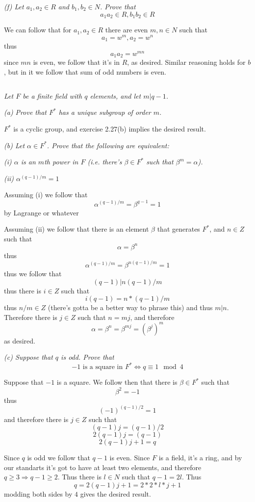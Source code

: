 \documentclass[11pt,oneside,titlepage]{book}
\DeclareMathOperator \lra {\Leftrightarrow}
\DeclareMathOperator \ra {\Rightarrow}
\begin{document}
\textit{(f) Let $a_1, a_2 \in R$ and $b_1, b_2 \in N$. Prove that
  $$a_1 a_2 \in R, b_1 b_2 \in R$$
}

We can follow that for $a_1, a_2 \in R$ there are even $m, n \in N$
such that
$$a_1 = w^m, a_2 = w^n$$
thus
$$a_1 a_2 = w^{mn}$$
since $mn$ is even, we follow that it's in $R$, as desired. Similar reasoning holds
for $b$, but in it we follow that sum of odd numbers is even.

\subsection{}

\textit{Let $F$ be a finite field with $q$ elements, and let $m | q - 1$.}

\textit{(a) Prove that $F^*$ has a unique subgroup of order $m$.}

$F^*$ is a cyclic group, and exercise 2.27(b) implies the desired result.

\textit{(b) Let $\alpha \in F^*$. Prove that the following are equivalent:}

\textit{(i) $\alpha$ is an $m$th power in $F$ (i.e. there's $\beta \in F^*$
  such that $\beta^m = \alpha$).}

\textit{(ii) $\alpha^{(q - 1)/m} = 1$}

Assuming (i) we follow that
$$\alpha^{(q - 1)/m} = \beta^{q - 1} = 1$$
by Lagrange or whatever

Assuming (ii) we follow that there is an element $\beta$ that
generates $F^*$, and $n \in Z$ such that
$$\alpha = \beta^n$$
thus
$$\alpha^{(q - 1)/m} =  \beta^{n(q - 1)/m} = 1$$
thus we follow that
$$(q - 1) | n(q - 1)/m$$
thus there is $i \in Z$ such that
$$i(q - 1) = n * (q - 1) / m$$
thus $n / m \in Z$ (there's gotta be a better way to phrase this) and
thus $m | n$. Therefore there is $j \in Z$ such that $n = mj$, and
therefore
$$\alpha = \beta^n = \beta^{mj} = (\beta^{j})^m$$
as desired.

\textit{(c) Suppose that $q$ is odd. Prove that
  $$-1 \text{ is a square in } F^* \lra q \equiv 1 \mod 4$$}

Suppose that $-1$ is a square. We follow then that there is
$\beta \in F^*$ such that
$$\beta^2 = -1$$
thus
$$(-1)^{(q - 1)/2} = 1$$
and therefore there is $j \in Z$ such that
$$(q - 1)j = (q - 1)/2$$
$$2(q - 1)j = (q - 1)$$
$$2(q - 1)j + 1 = q$$

Since $q$ is odd we follow that $q - 1$ is even. Since $F$ is a field, it's a
ring, and by our standarts it's got to have at least two elements, and therefore
$q \geq 3 \ra q - 1 \geq 2$. Thus there is $l \in N$ such that $q - 1 = 2l$. Thus
$$q = 2(q - 1)j + 1 = 2 * 2 * l * j + 1$$
modding both sides by $4$ gives the desired result.
\end{document}
